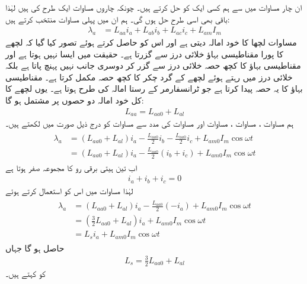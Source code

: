 ان چار مساوات میں سے ہم کسی ایک کو  حل کرتے ہیں۔ چونکہ چاروں مساوات ایک طرح کی ہیں لہٰذا  باقی بھی اسی طرح حل ہوں گی۔ ہم ان میں  پہلی  مساوات منتخب کرتے ہیں:
\begin{align}\label{مساوات_معاصر_ارتباط_الف_کل}
\lambda_a&=L_{aa} i_a+L_{ab} i_b +L_{ac} i_c+L_{am} I_m
\end{align}
 مساوات   لچھا    کا خود امالہ دیتی ہے اور اس کو حاصل کرتے ہوئے تصور کیا گیا کہ لچھے کا پورا مقناطیسی بہاؤ خلائی درز سے گزرتا ہے۔ حقیقت میں ایسا نہیں ہوتا ہے اور مقناطیسی بہاؤ  کا کچھ حصہ خلائی درز  سے گزر کر دوسری جانب نہیں پہنچ پاتا ہے بلکہ خلائی درز میں رہتے ہوئے لچھے کے گرد چکر کا کچھ حصہ مکمل کرتا ہے۔  مقناطیسی بہاؤ کا یہ حصہ     پیدا کرتا ہے جو  ٹرانسفارمر کے رستا امالہ کی طرح ہوتا ہے۔ یوں لچھے کا کل خود امالہ   دو حصوں پر مشتمل ہو گا:
\begin{align}\label{مساوات_معاصر_الف_خود_کل_امالہ}
L_{aa}=L_{aa0}+L_{al}
\end{align}
ہم مساوات ،  مساوات ،  مساوات   اور مساوات   کی مدد سے مساوات   کو درج ذیل صورت میں لکھتے ہیں۔
\begin{gather}
\begin{aligned}\label{مساوات_معاصر_ارتباط_الف}
\lambda_a&=\left(L_{aa0}+L_{al} \right)i_a-\frac{L_{aa0}}{2} i_b -\frac{L_{aa0}}{2} i_c+L_{am0} I_m \cos \omega t \\
&=\left(L_{aa0}+L_{al} \right)i_a-\frac{L_{aa0}}{2} \left( i_b+i_c \right)+L_{am0} I_m \cos \omega t
\end{aligned}
\end{gather}
اب تین ہیتی برقی رو کا مجموعہ صفر ہوتا ہے 
\begin{align}
i_a+i_b+i_c=0
\end{align}
لہٰذا مساوات   میں اس کو استعمال کرتے ہوئے
\begin{gather}
\begin{aligned}
\lambda_a&=\left(L_{aa0}+L_{al} \right)i_a-\frac{L_{aa0}}{2} \left( -i_a \right)+L_{am0} I_m \cos \omega t\\
&=\left(\frac{3}{2} L_{aa0}+L_{al} \right)i_a+L_{am0} I_m \cos \omega t\\
&=L_s i_a+L_{am0} I_m \cos \omega t
\end{aligned}
\end{gather}
حاصل ہو گا جہاں
\begin{align}\label{مساوات_معاصر_معاصر_امالہ}
L_s=\frac{3}{2} L_{aa0}+L_{al}
\end{align}
کو  کہتے ہیں۔

